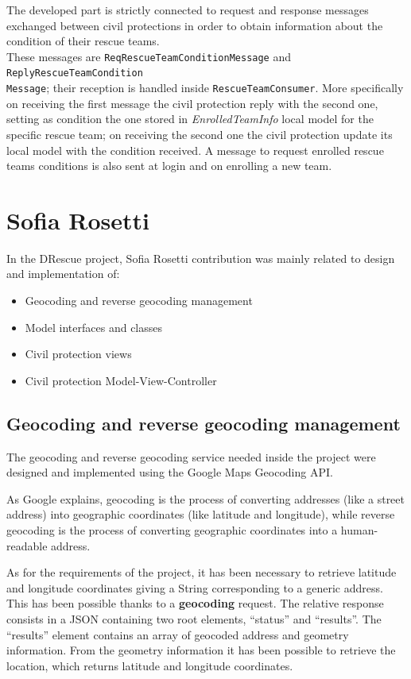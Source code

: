\documentclass[a4paper,12pt]{report}
\begin{document}
The developed part is strictly connected to request and response messages exchanged between civil protections in order to obtain information about the condition of their rescue teams.
\\These messages are \texttt{ReqRescueTeamConditionMessage} and \texttt{ReplyRescueTeamCondition\\Message}; their reception is handled inside \texttt{RescueTeamConsumer}. More specifically on receiving the first message the civil protection reply with the second one, setting as condition the one stored in \textit{EnrolledTeamInfo} local model for the specific rescue team; on receiving the second one the civil protection update its local model with the condition received.
A message to request enrolled rescue teams conditions is also sent at login and on enrolling a new team.

\section{Sofia Rosetti}
In the DRescue project, Sofia Rosetti contribution was mainly related to design and implementation of:

\begin{itemize}
\item Geocoding and reverse geocoding management
\item Model interfaces and classes
\item Civil protection views
\item Civil protection Model-View-Controller
\end{itemize}

\subsection{Geocoding and reverse geocoding management}
The geocoding and reverse geocoding service needed inside the project were designed and implemented using the Google Maps Geocoding API.

As Google explains, geocoding is the process of converting addresses (like a street address) into geographic coordinates (like latitude and longitude), while reverse geocoding is the process of converting geographic coordinates into a human-readable address.

As for the requirements of the project, it has been necessary to retrieve latitude and longitude coordinates giving a String corresponding to a generic address. This has been possible thanks to a \textbf{geocoding} request. The relative response consists in a JSON containing two root elements, ``status'' and ``results''. The ``results'' element contains an array of geocoded address and geometry information. From the geometry information it has been possible to retrieve the location, which returns latitude and longitude coordinates. 
\end{document}
